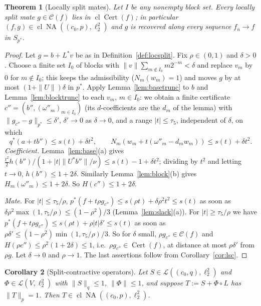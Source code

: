 \documentclass[10pt]{amsart}
\newtheorem{theorem}{Theorem}[section]
\newtheorem{corollary}[theorem]{Corollary}
\theoremstyle{definition}
\theoremstyle{remark}
\newcommand{\NA}{\operatorname{NA}}
\newcommand{\Cset}{\mathcal C}
\newcommand{\Cert}{\operatorname{Cert}}
\newcommand{\cl}{\operatorname{cl}}
\begin{document}
\begin{theorem}[Locally split mates]\label{thm:locsplit}
Let $I$ be any nonempty block set.  Every locally split mate
$g\in\Cset(f)$ lies in $\cl\Cert(f)$; in particular $(f,g)\in
\cl\NA((c_0,p),\ell_2^2)$ and $g$ is recovered along every sequence
$f_n\to f$ in $S_{p^*}$.
\end{theorem}

\begin{proof}
Let $g=b+L^*v$ be as in Definition~\ref{def:locsplit}.  Fix $\rho\in(0,1)$
and $\delta>0$.  Choose a finite set $I_0$ of blocks with
$\|v\|\sum_{m\notin I_0}m2^{-m}<\delta$ and replace $v_m$ by $0$ for
$m\notin I_0$; this keeps the admissibility ($N_m(w_m)=1$) and moves $g$ by
at most $(1+\|U\|)\delta$ in $p^*$.  Apply Lemma~\ref{lem:basetrunc} to $b$ and
Lemma~\ref{lem:blocktrunc} to each $v_m$, $m\in I_0$: we obtain a finite
certificate $c''=(b'',(\omega''_m)_{m\in I_0})$ \textup{(}its $d$-coefficients
are the $d_m$ of the lemma\textup{)} with $\|g_{c''}-g\|_{p^*}\le\delta'$,
$\delta'\to0$ as $\delta\to0$, and a range $|t|\le\tau_5$, independent of
$\delta$, on which
\[
 q^*(a+tb'')\le s(t)+\delta t^2,\qquad
 N_m(w_m+t(\omega''_m-d_mw_m))\le s(t)+\delta t^2 .
\]
\emph{Coefficient.}  Lemma~\ref{lem:base}(a) gives
$\frac{t^2}2h(b'')/(1+|t|\|U^*b''\|/\nu)\le s(t)-1+\delta t^2$; dividing
by $t^2$ and letting $t\to0$, $h(b'')\le1+2\delta$.  Similarly
Lemma~\ref{lem:block}(b) gives $H_m(\omega''_m)\le1+2\delta$.  So
$H(c'')\le1+2\delta$.

\emph{Mate.}  For $|t|\le\tau_5/\rho$,
$p^*(f+t\rho g_{c''})\le s(\rho t)+\delta\rho^2t^2\le s(t)$ as soon as
$\delta\rho^2\max(1,\tau_5/\rho)\le(1-\rho^2)/3$ (Lemma~\ref{lem:slack}(a)).
For $|t|\ge\tau_5/\rho$ we have $p^*(f+t\rho g_{c''})\le s(\rho
t)+\rho|t|\delta'\le s(t)$ as soon as
$\rho\delta'\le(1-\rho^2)\min(1,\tau_5/\rho)/3$.  So
for $\delta$ small, $\rho g_{c''}\in\Cset(f)$ and $H(\rho c'')\le
\rho^2(1+2\delta)\le1$, i.e.\ $\rho g_{c''}\in\Cert(f)$, at distance at most
$\rho\delta'$ from $\rho g$.  Let $\delta\to0$ and $\rho\to1$.  The last
assertions follow from Corollary~\ref{cor:lsc}.
\end{proof}

\begin{corollary}[Split-contractive operators]\label{cor:splitcontractive}
Let $S\in\mathcal L((c_0,q),\ell_2^2)$ and $\Phi\in\mathcal L(V,\ell_2^2)$
with $\|S\|_q\le1$, $\|\Phi\|\le1$, and suppose $T:=S+\Phi\circ L$ has
$\|T\|_p=1$.  Then $T\in\cl\NA((c_0,p),\ell_2^2)$.
\end{corollary}
\end{document}
